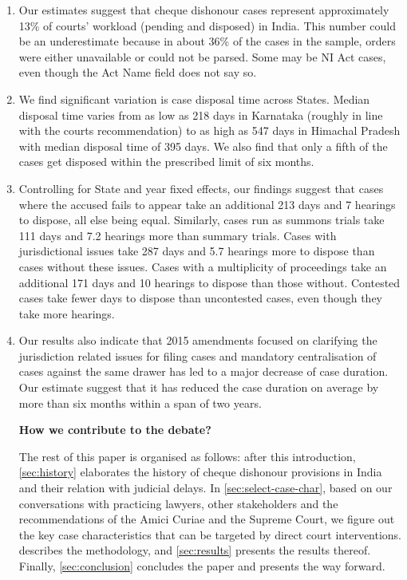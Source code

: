\begin{enumerate}
 \item Our estimates suggest that cheque dishonour cases represent approximately 13\% of courts' workload (pending and disposed) in India. This number could be an underestimate because in about 36\% of the cases in the sample, orders were either unavailable or could not be parsed. Some may be NI Act cases, even though the Act Name field does not say so.
\item We find significant variation is case disposal time across States. Median disposal time varies from as low as 218 days in Karnataka (roughly in line with the courts recommendation) to as high as 547 days in Himachal Pradesh with median disposal time of 395 days. We also find that only a fifth of the cases get disposed within the prescribed limit of six months.
\item Controlling for State and year fixed effects, our findings suggest that cases where the accused fails to appear take an additional 213 days and 7 hearings to dispose, all else being equal. Similarly, cases run as summons trials take 111 days and 7.2 hearings more than summary trials. Cases with jurisdictional issues take 287 days and 5.7 hearings more to dispose than cases without these issues. Cases with a multiplicity of proceedings take an additional 171 days and 10 hearings to dispose than those without. Contested cases take fewer days to dispose than uncontested cases, even though they take more hearings.
\item Our results also indicate that 2015 amendments focused on clarifying the jurisdiction related issues for filing cases and mandatory centralisation of cases against the same drawer has led to a major decrease of case duration. Our estimate suggest that it has reduced the case duration on average by more than six months within a span of two years.
\begin{enumerate}

\textbf{How we contribute to the debate?}

The rest of this paper is organised as follows: after this introduction, \cref{sec:history} elaborates the history of cheque dishonour provisions in India and their relation with judicial delays. In \cref{sec:select-case-char}, based on our conversations with practicing lawyers, other stakeholders and the recommendations of the Amici Curiae and the Supreme Court, we figure out the key case characteristics that can be targeted by direct court interventions.  describes the methodology, and \cref{sec:results} presents the results thereof. Finally, \cref{sec:conclusion} concludes the paper and presents the way forward.


\end{enumerate}
\end{enumerate}
